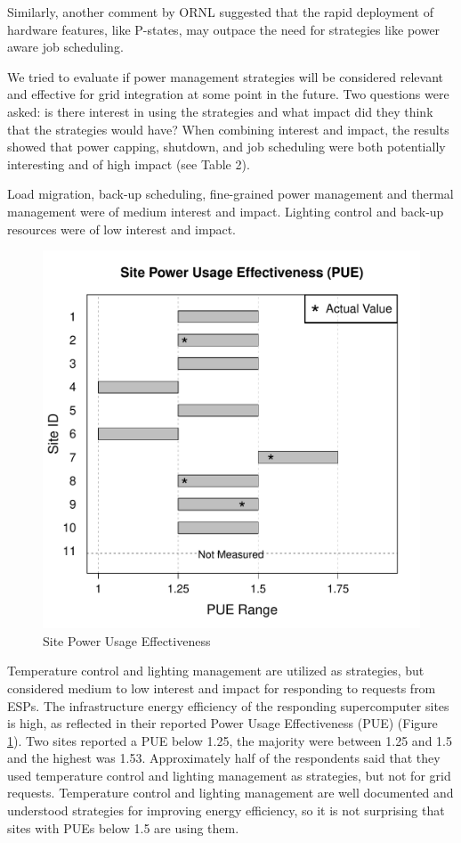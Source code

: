 Similarly, another comment by ORNL suggested that the rapid deployment of hardware features, like P-states,  may outpace the need for strategies like power aware job scheduling.

We tried to evaluate if power management strategies will be considered
relevant and effective for grid integration at some point in the future. Two
questions were asked: is there interest in using the strategies and what
impact did they think that the strategies would have? When combining
interest and impact, the results showed that power capping, shutdown, and
job scheduling were both potentially interesting and of high impact (see Table 2). 

Load migration, back-up
scheduling, fine-grained power management and thermal management were of medium
interest and impact. Lighting control and back-up resources were of low
interest and impact. 
\begin{figure}
\begin{center}
\includegraphics[scale=0.45]{NewGraphs/PUE-Graph.pdf}
\caption{Site Power Usage Effectiveness}
\label{figPUE}
\end{center}
\end{figure}

Temperature control and lighting management are utilized as strategies, but considered medium to low interest and impact
for responding to requests from ESPs. 
The infrastructure energy efficiency of the responding supercomputer sites is high, as reflected in their reported
Power Usage Effectiveness (PUE) (Figure \ref{figPUE}). Two sites reported a PUE below 1.25, the majority were between 
1.25 and 1.5 and the highest was 1.53. Approximately half of the respondents said that they used 
temperature control and lighting management
as strategies, but not for grid requests. Temperature control and lighting management are well documented and understood
strategies for improving energy efficiency, so it is not surprising that sites with PUEs below 1.5 are using them.

